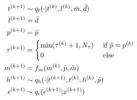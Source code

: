 \begin{subequations}
\begin{align}
t\ks{k+1} & \sim q_t (\cdot | t\ks{k},l\ks{k},\act{m},\act{d}) \label{eq:tp}\\
l\ks{k+1} &= \act{d} \\
p\ks{k+1} &= \act{p} \\
\atime\ks{k+1} & = \begin{cases}
                \min(\atime\ks{k} + 1,N_{\atime}) & \cif \act{p} = p\ks{k} \\
                0 & \celse 
    \end{cases} \label{eq:atimeP} \\
    m\ks{k+1} &= f_m(m\ks{k},\act{p},\act{m}) \\
\amem\ks{k+1} & \sim q_\amem(\cdot | t\ks{k+1}, t\ks{k},\amem\ks{k},\act{p}) \label{eq:amemp} \\
\epsilon\ks{k+1} & \sim q_\epsilon(\epsilon\ks{k+1}|x\ks{k+1})
\end{align}
\end{subequations}



